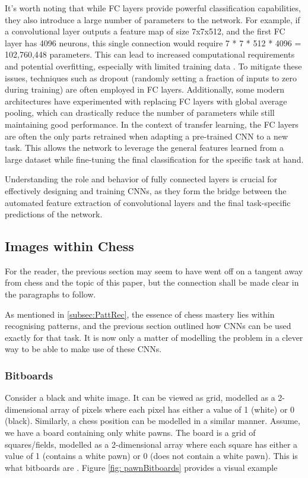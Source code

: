 It's worth noting that while FC layers provide powerful classification capabilities, they also introduce a large number of parameters to the network. For example, if a convolutional layer outputs a feature map of size 7x7x512, and the first FC layer has 4096 neurons, this single connection would require 7 * 7 * 512 * 4096 = 102,760,448 parameters. This can lead to increased computational requirements and potential overfitting, especially with limited training data \cite{DBLP:journals/corr/abs-1902-02771}.
To mitigate these issues, techniques such as dropout (randomly setting a fraction of inputs to zero during training) are often employed in FC layers. Additionally, some modern architectures have experimented with replacing FC layers with global average pooling, which can drastically reduce the number of parameters while still maintaining good performance.
In the context of transfer learning, the FC layers are often the only parts retrained when adapting a pre-trained CNN to a new task. This allows the network to leverage the general features learned from a large dataset while fine-tuning the final classification for the specific task at hand.

Understanding the role and behavior of fully connected layers is crucial for effectively designing and training CNNs, as they form the bridge between the automated feature extraction of convolutional layers and the final task-specific predictions of the network.

\subsection{Images within Chess}
For the reader, the previous section may seem to have went off on a tangent away from chess and the topic of this paper, but the connection shall be made clear in the paragraphs to follow.

As mentioned in \ref{subsec:PattRec}, the essence of chess mastery lies within recognising patterns, and the previous section outlined how CNNs can be used exactly for that task. It is now only a matter of modelling the problem in a clever way to be able to make use of these CNNs.

\subsubsection{Bitboards}
Consider a black and white image. It can be viewed as grid, modelled as a 2-dimensional array of pixels where each pixel has either a value of 1 (white) or 0 (black). Similarly, a chess position can be modelled in a similar manner. Assume, we have a board containing only white pawns. The board is a grid of squares/fields, modelled as a 2-dimensional array where each square has either a value of 1 (contains a white pawn) or 0 (does not contain a white pawn). This is what bitboards are \cite{BitBoards}. Figure \ref{fig: pawnBitboards} provides a visual example

